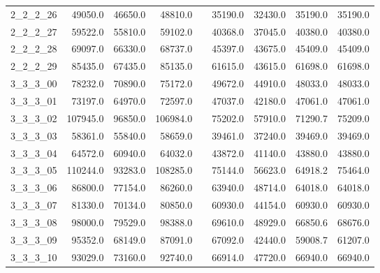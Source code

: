 \begin{longtable}{lrrrcrrrr}
2\_2\_2\_26      &     49050.0 &       46650.0 &        48810.0 &&       35190.0 &         32430.0 &          35190.0 &          35190.0 \\
2\_2\_2\_27      &     59522.0 &       55810.0 &        59102.0 &&       40368.0 &         37045.0 &          40380.0 &          40380.0 \\
2\_2\_2\_28      &     69097.0 &       66330.0 &        68737.0 &&       45397.0 &         43675.0 &          45409.0 &          45409.0 \\
2\_2\_2\_29      &     85435.0 &       67435.0 &        85135.0 &&       61615.0 &         43615.0 &          61698.0 &          61698.0 \\
3\_3\_3\_00      &     78232.0 &       70890.0 &        75172.0 &&       49672.0 &         44910.0 &          48033.0 &          48033.0 \\
3\_3\_3\_01      &     73197.0 &       64970.0 &        72597.0 &&       47037.0 &         42180.0 &          47061.0 &          47061.0 \\
3\_3\_3\_02      &    107945.0 &       96850.0 &       106984.0 &&       75202.0 &         57910.0 &          71290.7 &          75209.0 \\
3\_3\_3\_03      &     58361.0 &       55840.0 &        58659.0 &&       39461.0 &         37240.0 &          39469.0 &          39469.0 \\
3\_3\_3\_04      &     64572.0 &       60940.0 &        64032.0 &&       43872.0 &         41140.0 &          43880.0 &          43880.0 \\
3\_3\_3\_05      &    110244.0 &       93283.0 &       108285.0 &&       75144.0 &         56623.0 &          64918.2 &          75464.0 \\
3\_3\_3\_06      &     86800.0 &       77154.0 &        86260.0 &&       63940.0 &         48714.0 &          64018.0 &          64018.0 \\
3\_3\_3\_07      &     81330.0 &       70134.0 &        80850.0 &&       60930.0 &         44154.0 &          60930.0 &          60930.0 \\
3\_3\_3\_08      &     98000.0 &       79529.0 &        98388.0 &&       69610.0 &         48929.0 &          66850.6 &          68676.0 \\
3\_3\_3\_09      &     95352.0 &       68149.0 &        87091.0 &&       67092.0 &         42440.0 &          59008.7 &          61207.0 \\
3\_3\_3\_10      &     93029.0 &       73160.0 &        92740.0 &&       66914.0 &         47720.0 &          66940.0 &          66940.0 \\

\end{longtable}
